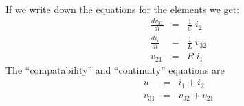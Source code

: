 If we write down the equations for the elements we get:
\begin{eqnarray*}
  \frac{dv_{31}}{dt} &=& \frac{1}{C}\ i_2 \\
  \frac{di_{i}}{dt} &=& \frac{1}{L}\ v_{32} \\
  v_{21} &=& R\ i_1
\end{eqnarray*}
The ``compatability'' and ``continuity'' equations are
\begin{eqnarray*}
  u &=& i_1 + i_2 \\
  v_{31} &=& v_{32} + v_{21}
\end{eqnarray*}

\endinput
